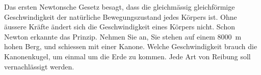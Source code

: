 
\begin{aufgabe}
	Das ersten Newtonsche Gesetz besagt, dass die gleichmässig gleichförmige Geschwindigkeit der natürliche Bewegungszustand
	jedes Körpers ist. Ohne äussere Kräfte ändert sich die Geschwindigkeit eines Körpers nicht.
	Schon Newton erkannte das Prinzip. Nehmen Sie an, Sie stehen auf einem \SI{8000}{m} hohen Berg, und schiessen mit
	einer Kanone. Welche Geschwindigkeit brauch die Kanonenkugel, um einmal um die Erde zu kommen.
	Jede Art von Reibung soll vernachlässigt werden.
\end{aufgabe}
\begin{center}
\end{center}
\begin{loesung}

\end{loesung}
